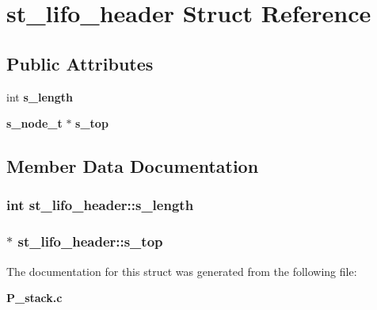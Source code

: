 \section{st\_\-lifo\_\-header  Struct Reference}
\label{structst__lifo__header}
\subsection*{Public Attributes}
\begin{CompactItemize}
\item 
int {\bf s\_\-length}
\item 
{\bf s\_\-node\_\-t} $\ast$ {\bf s\_\-top}
\end{CompactItemize}


\subsection{Member Data Documentation}
\subsubsection{\setlength{\rightskip}{0pt plus 5cm}int st\_\-lifo\_\-header::s\_\-length}\label{structst__lifo__header_m0}


\subsubsection{$\ast$ st\_\-lifo\_\-header::s\_\-top}\label{structst__lifo__header_m1}




The documentation for this struct was generated from the following file:\begin{CompactItemize}
\item 
{\bf P\_\-stack.c}\end{CompactItemize}
